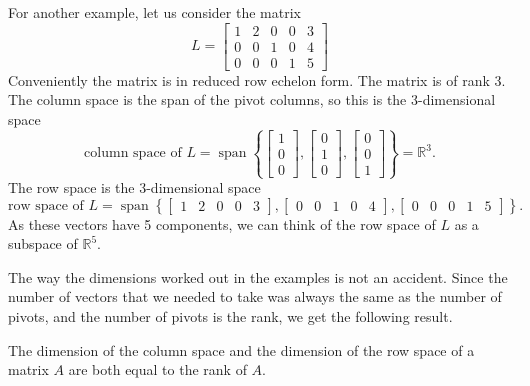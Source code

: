 \begin{example}
For another example, let us consider the matrix 
\begin{equation*}
L =
\begin{bmatrix}
{1} & 2 & 0 & 0 & 3 \\
0 & 0 & {1} & 0 & 4 \\
0 & 0 & 0 & {1} & 5
\end{bmatrix} 
\end{equation*}
Conveniently the matrix is in reduced row echelon form.  The matrix
is of rank 3.
The column space is the span of
the pivot columns, so this is
the 3-dimensional space
\begin{equation*}
\text{column space of $L$} =
\operatorname{span} \left\{
\begin{bmatrix}
{1} \\
0 \\
0
\end{bmatrix} 
,
\begin{bmatrix}
 0 \\
 {1} \\
 0 
\end{bmatrix} 
,
\begin{bmatrix}
0 \\
0 \\
{1} 
\end{bmatrix} 
\right\}
= {\mathbb{R}}^3 .
\end{equation*}
The row space is the 3-dimensional space
\begin{equation*}
\text{row space of $L$} =
\operatorname{span} \left\{
\begin{bmatrix}
{1} & 2 & 0 & 0 & 3
\end{bmatrix} 
,
\begin{bmatrix}
0 & 0 & {1} & 0 & 4
\end{bmatrix} 
,
\begin{bmatrix}
0 & 0 & 0 & {1} & 5
\end{bmatrix} 
\right\} .
\end{equation*}
As these vectors have 5 components, we can think of the row space of $L$
as a subspace of ${\mathbb{R}}^5$.
\end{example}

The way the dimensions worked out in the examples is not 
an accident.  Since the number of vectors that we needed to take
was always the same as the number of pivots, and the number of pivots
is the rank, we get the following result.

\begin{theorem}[Rank]
The dimension of the column space and the dimension of the row space 
of a matrix $A$ are both equal to the rank of $A$.
\end{theorem}

